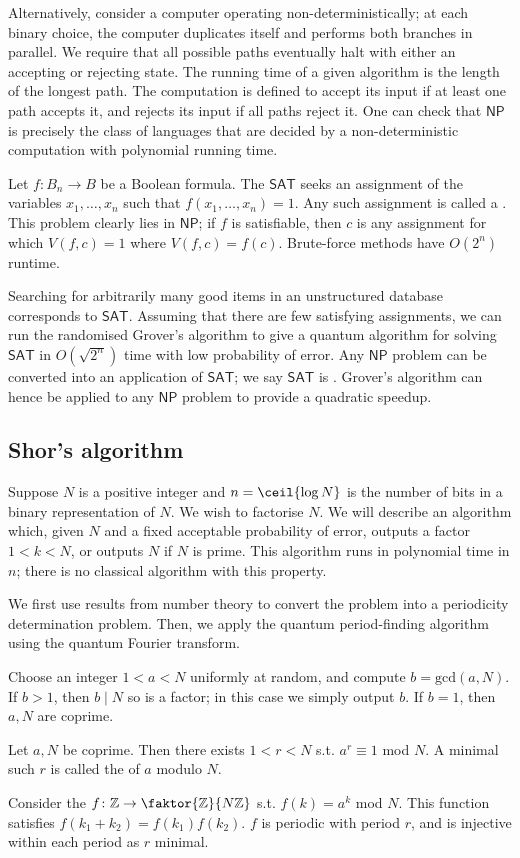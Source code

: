 Alternatively, consider a computer operating non-deterministically; at each binary choice, the computer duplicates itself and performs both branches in parallel.
We require that all possible paths eventually halt with either an accepting or rejecting state.
The running time of a given algorithm is the length of the longest path.
The computation is defined to accept its input if at least one path accepts it, and rejects its input if all paths reject it.
One can check that $\mathsf{NP}$ is precisely the class of languages that are decided by a non-deterministic computation with polynomial running time.

Let $f \colon B_n \to B$ be a Boolean formula.
The  $\mathsf{SAT}$ seeks an assignment of the variables $x_1, \dots, x_n$ such that $f(x_1, \dots, x_n) = 1$.
Any such assignment is called a .
This problem clearly lies in $\mathsf{NP}$; if $f$ is satisfiable, then $c$ is any assignment for which $V(f,c) = 1$ where $V(f,c) = f(c)$.
Brute-force methods have $O(2^n)$ runtime.

Searching for arbitrarily many good items in an unstructured database corresponds to $\mathsf{SAT}$.
Assuming that there are few satisfying assignments, we can run the randomised Grover's algorithm to give a quantum algorithm for solving $\mathsf{SAT}$ in $O(\sqrt{2^n})$ time with low probability of error.
Any $\mathsf{NP}$ problem can be converted into an application of $\mathsf{SAT}$; we say $\mathsf{SAT}$ is .
Grover's algorithm can hence be applied to any $\mathsf{NP}$ problem to provide a quadratic speedup.

\subsection{Shor's algorithm}
Suppose $N$ is a positive integer and $n = \ceil{\log N}$ is the number of bits in a binary representation of $N$.
We wish to factorise $N$.
We will describe an algorithm which, given $N$ and a fixed acceptable probability of error, outputs a factor $1 < k < N$, or outputs $N$ if $N$ is prime.
This algorithm runs in polynomial time in $n$; there is no classical algorithm with this property.

We first use results from number theory to convert the problem into a periodicity determination problem.
Then, we apply the quantum period-finding algorithm using the quantum Fourier transform.

Choose an integer $1 < a < N$ uniformly at random, and compute $b = \mathrm{gcd}(a,N)$.
If $b > 1$, then $b \mid N$ so is a factor; in this case we simply output $b$.
If $b = 1$, then $a, N$ are coprime.
\begin{theorem}
    Let $a, N$ be coprime.
    Then there exists $1 < r < N$ s.t. $a^r \equiv 1$ mod $N$.
    A minimal such $r$ is called the  of $a$ modulo $N$.
\end{theorem}
Consider the  $f \colon \mathbb Z \to \faktor{\mathbb Z}{N\mathbb Z}$ s.t. $f(k) = a^k$ mod $N$.
This function satisfies $f(k_1 + k_2) = f(k_1)f(k_2)$.
$f$ is periodic with period $r$, and is injective within each period as $r$ minimal.

